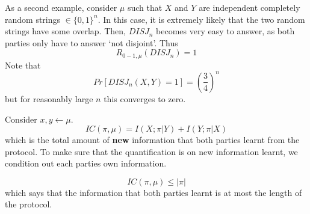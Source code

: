 As a second example, consider $\mu$ such that $X$ and $Y$ are independent completely random strings $\in \{0,1\}^n$. In this case, it is extremely likely that the two random strings have some overlap. Then, $DISJ_n$ becomes very easy to answer, as both parties only have to answer `not disjoint'. Thus
\begin{equation}
	R_{0-1, \mu}(DISJ_n) = 1
\end{equation}
Note that 
\begin{equation}
	Pr[DISJ_n(X, Y) = 1] = \left( \frac{3}{4} \right) ^n 
\end{equation}
but for reasonably large $n$ this converges to zero. 

\begin{definition}
	Consider $x, y \gets \mu$. 
	\begin{equation}
		IC(\pi, \mu) = I(X;\pi |Y) + I(Y; \pi |X)
	\end{equation}
	which is the total amount of \textbf{new} information that both parties learnt from the protocol. To make sure that the quantification is on new information learnt, we condition out each parties own information. 
\end{definition}

\begin{proposition}
	\begin{equation}
		IC(\pi, \mu) \leq |\pi|
	\end{equation}
	which says that the information that both parties learnt is at most the length of the protocol. 
\end{proposition}

